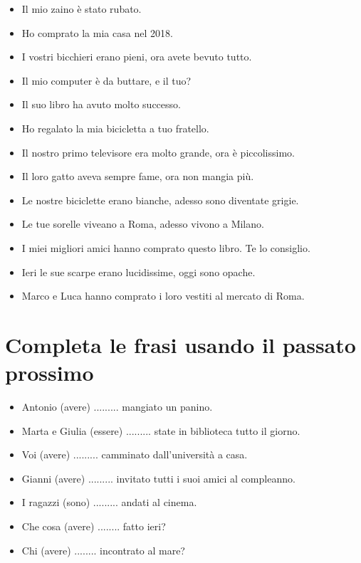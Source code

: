 \documentclass[letter,11pt]{article}
\begin{document}
\vskip 0.5in
\begin{multicols}{2}
\begin{itemize}
    \item Il mio zaino è stato rubato.
    \item Ho comprato la mia casa nel 2018.
    \item I vostri bicchieri erano pieni, ora avete bevuto tutto.
    \item Il mio computer è da buttare, e il tuo?
    \item Il suo libro ha avuto molto successo.
    \item Ho regalato la mia bicicletta a tuo fratello.
    \item Il nostro primo televisore era molto grande, ora è piccolissimo.
    \item Il loro gatto aveva sempre fame, ora non mangia più.
    \item Le nostre biciclette erano bianche, adesso sono diventate grigie.
    \item Le tue sorelle viveano a Roma, adesso vivono a Milano.
    \item I miei migliori amici hanno comprato questo libro. Te lo consiglio.
    \item Ieri le sue scarpe erano lucidissime, oggi sono opache.
    \item Marco e Luca hanno comprato i loro vestiti al mercato di Roma.


\end{itemize}
\end{multicols}


\vskip 0.2in
\section*{Completa le frasi usando il passato prossimo}

\begin{itemize}
    \item Antonio (avere) ......... mangiato un panino.
    \item Marta e Giulia (essere) ......... state in biblioteca tutto il giorno.
    \item Voi (avere) ......... camminato dall'università a casa.
    \item Gianni (avere) ......... invitato tutti i suoi amici al compleanno.
    \item I ragazzi (sono) ......... andati al cinema.
    \item Che cosa (avere) ........ fatto ieri?
    \item Chi (avere) ........ incontrato al mare?


\end{itemize}

\vskip 0.2in
\end{document}
